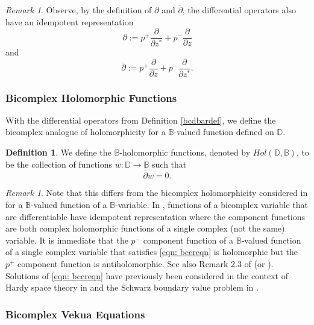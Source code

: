 \documentclass[12pt,reqno]{amsart}
\theoremstyle{definition}
\newtheorem{deff}[theorem]{Definition}
\theoremstyle{remark}
\newtheorem{comm}[theorem]{Remark}
\newcommand{\p}{\partial}
\newcommand{\dbar}{\bar\partial}
\newcommand{\bc}{\mathbb{B}}
\newcommand{\disk}{\mathbb{D}}
\begin{document}
  \begin{comm}\label{remark: idempotentdiffop} Observe, by the definition of $\p$ and $\dbar$, the differential operators also have an idempotent representation
    \[
        \p:= p^+ \frac{\p}{\p z^*} + p^- \frac{\p }{\p z}
    \]
    and 
    \[
        \dbar := p^+ \frac{\p}{\p z} + p^- \frac{\p }{\p z^*}.
    \]
    \end{comm}



    \subsubsection{Bicomplex Holomorphic Functions}

        With the differential operators from Definition \ref{bcdbardef}, we define the bicomplex analogue of holomorphicity for a $\bc$-valued function defined on $\disk$.

        \begin{deff}
            We define the $\bc$-holomorphic functions, denoted by $Hol(\disk,\bc)$, to be the collection of functions $w: \disk \to\bc$ such that
            \begin{equation}\label{eqn: bccreqn}
                \dbar w = 0.
            \end{equation}
        \end{deff}

        \begin{comm}
            Note that this differs from the bicomplex holomorphicity considered in \cite{BCHolo} for a $\bc$-valued function of a $\bc$-variable. In \cite{BCHolo}, functions of a bicomplex variable that are differentiable have idempotent representation where the component functions are both complex holomorphic functions of a single complex (not the same) variable. It is immediate that the $p^-$ component function of a $\bc$-valued function of a single complex variable that satisfies \eqref{eqn: bccreqn} is holomorphic but the $p^+$ component function is antiholomorphic. See also Remark 2.3 of \cite{BCAtomic} (or \cite{FundBicomplex, BCTransmutation, BCBergman}). Solutions of \eqref{eqn: bccreqn} have previously been considered in the context of Hardy space theory in \cite{BCAtomic} and the Schwarz boundary value problem in \cite{BCSchwarz}.  
        \end{comm}




    \subsubsection{Bicomplex Vekua Equations}
\end{document}
